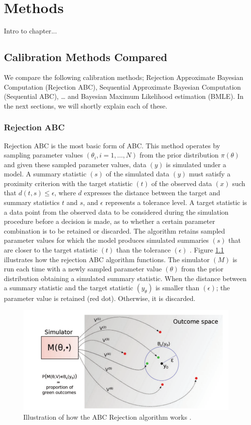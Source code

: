 \chapter{Methods}
Intro to chapter...
\label{chp:LIT}
\section{Calibration Methods Compared}
We compare the following calibration methods; Rejection Approximate Bayesian Computation (Rejection ABC), Sequential Approximate Bayesian Computation (Sequential ABC), … and Bayesian Maximum Likelihood estimation (BMLE). In the next sections, we will shortly explain each of these.

\subsection{Rejection ABC}
Rejection ABC is the most basic form of ABC. This method operates by sampling parameter values $(\theta_i,i = 1,… ,N)$ from the prior distribution $\pi(\theta)$  and given these sampled parameter values, data $(y)$ is simulated under a model. A summary statistic $(s)$ of the simulated data $(y)$ must satisfy a proximity criterion with the target statistic $(t)$ of the observed data $(x)$ such that $d(t,s ) \leq \epsilon$, where $d$ expresses the distance between the target and summary statistics $t$ and $s$, and $\epsilon$ represents a tolerance level. A target statistic is a data point from the observed data to be considered during the simulation procedure before a decision is made, as to whether a certain parameter combination is to be retained or discarded. The algorithm retains sampled parameter values for which the model produces simulated summaries $(s)$ that are closer to the target statistic $(t)$ than the tolerance $(\epsilon)$ \cite{sun}. Figure \ref{rej} illustrates how the rejection ABC algorithm functions. The simulator $(M)$ is run each time with a newly sampled parameter value $(\theta)$ from the prior distribution obtaining a simulated summary statistic. When the distance between a summary statistic and the target statistic $(y_\theta)$ is smaller than $(\epsilon)$; the parameter value is retained (red dot). Otherwise, it is discarded.

\begin{figure}[h!]
	\includegraphics[width=\linewidth]{rej.png}
	\caption{Illustration of how the ABC Rejection algorithm works \cite{lint}.}
	\label{rej}
\end{figure}


